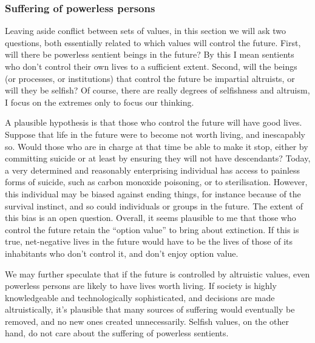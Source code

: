 \documentclass[british]{article}
\begin{document}
\subsubsection{Suffering of powerless persons}\label{powerless}
Leaving aside conflict between sets of values, in this section we will ask two questions, both essentially related to which values will control the future. First, will there be powerless sentient beings in the future? By this I mean sentients who don't control their own lives to a sufficient extent. Second, will the beings (or processes, or institutions) that control the future be impartial altruists, or will they be selfish? Of course, there are really degrees of selfishness and altruism, I focus on the extremes only to focus our thinking.

A plausible hypothesis is that those who control the future will have good lives. Suppose that life in the future were to become not worth living, and inescapably so. Would those who are in charge at that time be able to make it stop, either by committing suicide or at least by ensuring they will not have descendants? Today, a very determined and reasonably enterprising individual has access to painless forms of suicide, such as carbon monoxide poisoning, or to sterilisation. However, this individual may be biased against ending things, for instance because of the survival instinct, and so could individuals or groups in the future. The extent of this bias is an open question. Overall, it seems plausible to me that those who control the future retain the ``option value'' to bring about extinction. If this is true, net-negative lives in the future would have to be the lives of those of its inhabitants who don't control it, and don't enjoy option value.

We may further speculate that if the future is controlled by altruistic values, even powerless persons are likely to have lives worth living. If society is highly knowledgeable and technologically sophisticated, and decisions are made altruistically, it's plausible that many sources of suffering would eventually be removed, and no new ones created unnecessarily. Selfish values, on the other hand, do not care about the suffering of powerless sentients. 
\end{document}

